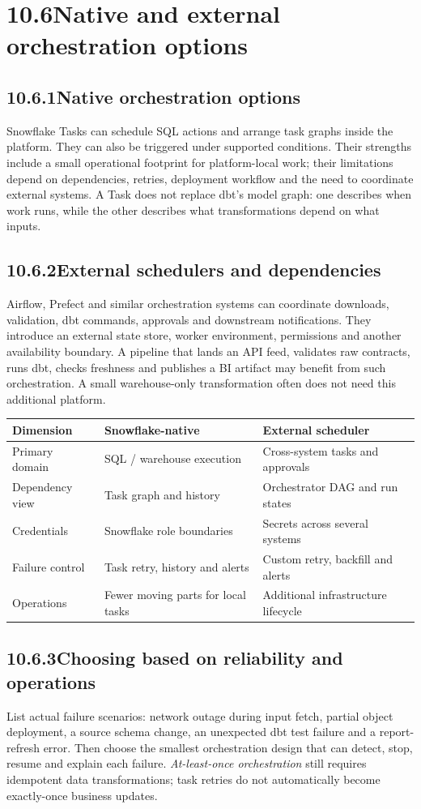 \documentclass[11pt,twoside]{article}
\newcommand{\topic}[2]{\subsection*{#1\quad #2}}
\begin{document}
\section*{10.6\quad Native and external orchestration options}
\topic{10.6.1}{Native orchestration options}
Snowflake Tasks can schedule SQL actions and arrange task graphs inside the platform. They can also be triggered under supported conditions. Their strengths include a small operational footprint for platform-local work; their limitations depend on dependencies, retries, deployment workflow and the need to coordinate external systems. A Task does not replace dbt's model graph: one describes when work runs, while the other describes what transformations depend on what inputs.
\topic{10.6.2}{External schedulers and dependencies}
Airflow, Prefect and similar orchestration systems can coordinate downloads, validation, dbt commands, approvals and downstream notifications. They introduce an external state store, worker environment, permissions and another availability boundary. A pipeline that lands an API feed, validates raw contracts, runs dbt, checks freshness and publishes a BI artifact may benefit from such orchestration. A small warehouse-only transformation often does not need this additional platform.
\begin{center}\renewcommand{\arraystretch}{1.10}\begin{tabularx}{\linewidth}{@{}p{32mm}XX@{}}\toprule
\textbf{Dimension}&\textbf{Snowflake-native}&\textbf{External scheduler}\\\midrule
Primary domain&SQL / warehouse execution&Cross-system tasks and approvals\\
Dependency view&Task graph and history&Orchestrator DAG and run states\\
Credentials&Snowflake role boundaries&Secrets across several systems\\
Failure control&Task retry, history and alerts&Custom retry, backfill and alerts\\
Operations&Fewer moving parts for local tasks&Additional infrastructure lifecycle\\\bottomrule\end{tabularx}\end{center}
\topic{10.6.3}{Choosing based on reliability and operations}
List actual failure scenarios: network outage during input fetch, partial object deployment, a source schema change, an unexpected dbt test failure and a report-refresh error. Then choose the smallest orchestration design that can detect, stop, resume and explain each failure. \emph{At-least-once orchestration} still requires idempotent data transformations; task retries do not automatically become exactly-once business updates.
\end{document}
